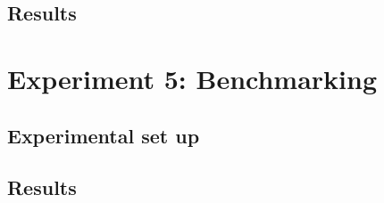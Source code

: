 \subsection{Results}

\section{Experiment 5: Benchmarking}

\subsection{Experimental set up}

\subsection{Results}

